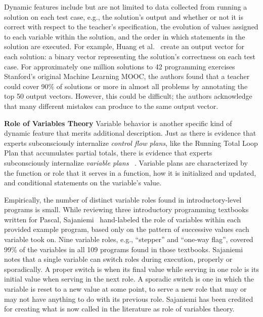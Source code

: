 Dynamic features include but are not limited to data collected from running a solution on each test case, e.g., the solution's output and whether or not it is correct with respect to the teacher's specification, the evolution of values assigned to each variable within the solution, and the order in which statements in the solution are executed. For example, Huang et al.~\cite{MOOCshop} create an output vector for each solution: a binary vector representing the solution's correctness on each test case. For approximately one million solutions to 42 programming exercises Stanford's original Machine Learning MOOC, the authors found that a teacher could cover 90\% of solutions or more in almost all problems by annotating the top 50 output vectors. However, this could be difficult; the authors acknowledge that many different mistakes can produce to the same output vector.

{\bf Role of Variables Theory}
Variable behavior is another specific kind of dynamic feature that merits additional description. Just as there is evidence that experts subconsciously internalize {\it control flow plans}, like the Running Total Loop Plan that accumulates partial totals, there is evidence that experts subconsciously internalize {\it variable plans} ~\cite{variableplans}. Variable plans are characterized by the function or role that it serves in a function, how it is initialized and updated, and conditional statements on the variable's value. 

Empirically, the number of distinct variable roles found in introductory-level programs is small. While reviewing three introductory programming textbooks written for Pascal, Sajaniemi~\cite{sajaniemi2002empirical} hand-labeled the role of variables within each provided example program, based only on the pattern of successive values each variable took on. Nine variable roles, e.g., ``stepper'' and ``one-way flag'', covered 99\% of the variables in all 109 programs found in those textbooks. Sajaniemi notes that a single variable can switch roles during execution, properly or sporadically. A proper switch is when its final value while serving in one role is its initial value when serving in the next role. A sporadic switch is one in which the variable is reset to a new value at some point, to serve a new role that may or may not have anything to do with its previous role.  Sajaniemi has been credited for creating what is now called in the literature as role of variables theory. 

